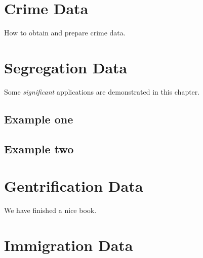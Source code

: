 \documentclass[
]{book}
\begin{document}
\hypertarget{crime}{%
\chapter{Crime Data}\label{crime}}

How to obtain and prepare crime data.

\hypertarget{segregation}{%
\chapter{Segregation Data}\label{segregation}}

Some \emph{significant} applications are demonstrated in this chapter.

\hypertarget{example-one}{%
\section{Example one}\label{example-one}}

\hypertarget{example-two}{%
\section{Example two}\label{example-two}}

\hypertarget{gentrification}{%
\chapter{Gentrification Data}\label{gentrification}}

We have finished a nice book.

\hypertarget{immigration}{%
\chapter{Immigration Data}\label{immigration}}

  
\end{document}

